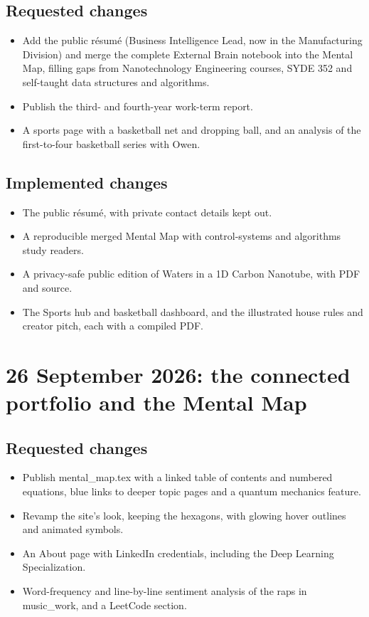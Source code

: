 \documentclass[11pt]{article}
\begin{document}
\subsection{Requested changes}
\begin{itemize}
\item Add the public r\'esum\'e (Business Intelligence Lead, now in the Manufacturing Division) and merge the complete External Brain notebook into the Mental Map, filling gaps from Nanotechnology Engineering courses, SYDE 352 and self-taught data structures and algorithms.
\item Publish the third- and fourth-year work-term report.
\item A sports page with a basketball net and dropping ball, and an analysis of the first-to-four basketball series with Owen.
\end{itemize}
\subsection{Implemented changes}
\begin{itemize}
\item The public r\'esum\'e, with private contact details kept out.
\item A reproducible merged Mental Map with control-systems and algorithms study readers.
\item A privacy-safe public edition of Waters in a 1D Carbon Nanotube, with PDF and source.
\item The Sports hub and basketball dashboard, and the illustrated house rules and creator pitch, each with a compiled PDF.
\end{itemize}

\section{26 September 2026: the connected portfolio and the Mental Map}
\subsection{Requested changes}
\begin{itemize}
\item Publish mental\_map.tex with a linked table of contents and numbered equations, blue links to deeper topic pages and a quantum mechanics feature.
\item Revamp the site's look, keeping the hexagons, with glowing hover outlines and animated symbols.
\item An About page with LinkedIn credentials, including the Deep Learning Specialization.
\item Word-frequency and line-by-line sentiment analysis of the raps in music\_work, and a LeetCode section.
\end{itemize}
\end{document}
